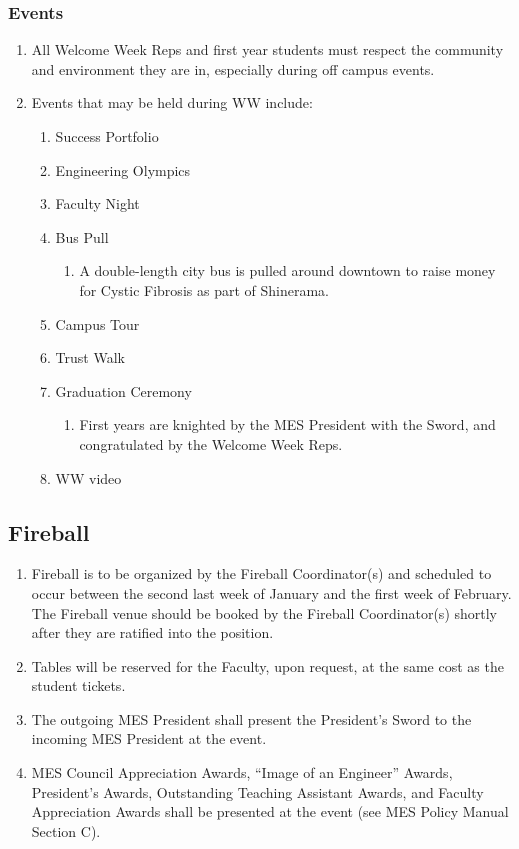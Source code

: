 \subsubsection{Events}
\label{events}
\begin{enumerate}
 \item
  All Welcome Week Reps and first year students must respect the community and environment they are in, especially during off campus events.
 \item
  Events that may be held during WW include:

  \begin{enumerate}
   \item
    Success Portfolio
   \item
    Engineering Olympics
   \item
    Faculty Night
   \item
    Bus Pull

    \begin{enumerate}
     \item
      A double-length city bus is pulled around downtown to raise money for Cystic Fibrosis as part of Shinerama.
    \end{enumerate}
   \item
    Campus Tour
   \item
    Trust Walk
   \item
    Graduation Ceremony

    \begin{enumerate}
     \item
      First years are knighted by the MES President with the Sword, and congratulated by the Welcome Week Reps.
    \end{enumerate}
   \item
    WW video
  \end{enumerate}
\end{enumerate}

\subsection{Fireball}
\label{fireball}
\begin{enumerate}
 \item
  Fireball is to be organized by the Fireball Coordinator(s) and scheduled to occur between the second last week of January and the first week of February. The Fireball venue should be booked by the Fireball Coordinator(s) shortly after they are ratified into the position.
 \item
  Tables will be reserved for the Faculty, upon request, at the same cost as the student tickets.
 \item
  The outgoing MES President shall present the President's Sword to the incoming MES President at the event.
 \item
  MES Council Appreciation Awards, ``Image of an Engineer'' Awards, President's Awards, Outstanding Teaching Assistant Awards, and Faculty Appreciation Awards shall be presented at the event (see MES Policy Manual Section C). %

\end{enumerate}

